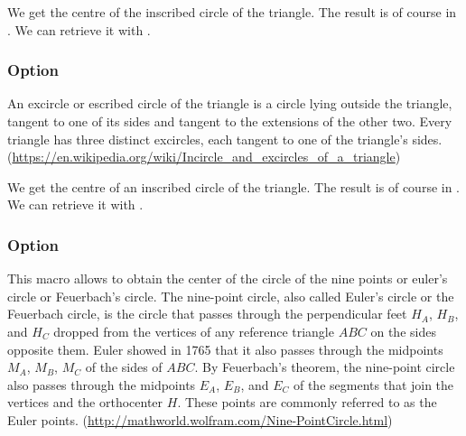  \medskip
 We get the centre of the inscribed circle of the triangle. The result is of course in . We can retrieve it with .

\begin{tkzexample}[latex=6cm,small]
\end{tkzexample}

\subsubsection{Option }
An excircle or escribed circle of the triangle is a circle lying outside the triangle, tangent to one of its sides and tangent to the extensions of the other two. Every triangle has three distinct excircles, each tangent to one of the triangle's sides.
(\url{https://en.wikipedia.org/wiki/Incircle_and_excircles_of_a_triangle})


 We get the centre of an inscribed circle of the triangle. The result is of course in . We can retrieve it with .

\begin{tkzexample}[latex=8cm,small]
\end{tkzexample}

\subsubsection{Option }
This macro allows to obtain the center of the circle of the nine points or euler's circle or Feuerbach's circle.
The nine-point circle, also called Euler's circle or the Feuerbach circle, is the circle that passes through the perpendicular feet $H_A$, $H_B$, and $H_C$ dropped from the vertices of any reference triangle $ABC$ on the sides opposite them. Euler showed in 1765 that it also passes through the midpoints $M_A$, $M_B$, $M_C$ of the sides of $ABC$. By Feuerbach's theorem, the nine-point circle also passes through the midpoints $E_A$, $E_B$, and $E_C$ of the segments that join the vertices and the orthocenter $H$. These points are commonly referred to as the Euler points. (\url{http://mathworld.wolfram.com/Nine-PointCircle.html})

